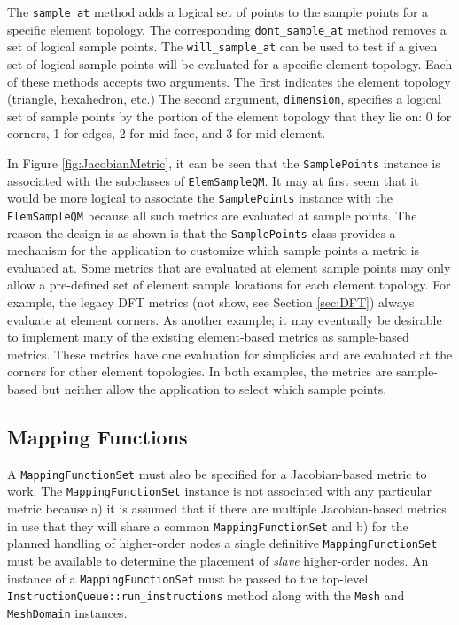\documentclass{article}
\begin{document}
The \texttt{sample\_at} method adds a logical set of points to the sample points for a specific element topology.  The corresponding \texttt{dont\_sample\_at} method removes a set of logical sample points.  The \texttt{will\_sample\_at} can be used to test if a given set of logical sample points will be evaluated for a specific element topology.  Each of these methods accepts two arguments.  The first indicates the element topology (triangle, hexahedron, etc.)  The second argument, \texttt{dimension}, specifies a logical set of sample points by the portion of the element topology that they lie on: 0 for corners, 1 for edges, 2 for mid-face, and 3 for mid-element.

In Figure \ref{fig:JacobianMetric}, it can be seen that the \texttt{SamplePoints} instance is associated with the subclasses of \texttt{ElemSampleQM}.  It may at first seem that it would be more logical to associate the \texttt{SamplePoints} instance with the \texttt{ElemSampleQM} because all such metrics are evaluated at sample points.  The reason the design is as shown is that the \texttt{SamplePoints} class provides a mechanism for the application to customize which sample points a metric is evaluated at.  Some metrics that are evaluated at element sample points may only allow a pre-defined set of element sample locations for each element topology.  For example, the legacy DFT metrics (not show, see Section \ref{sec:DFT}) always evaluate at element corners.  As another example; it may eventually be desirable to implement many of the existing element-based metrics as sample-based metrics.  These metrics have one evaluation for simplicies and are evaluated at the corners for other element topologies.  In both examples, the metrics are sample-based but neither allow the application to select which sample points.

\subsection{Mapping Functions}

A \texttt{MappingFunctionSet} must also be specified for a Jacobian-based metric to work.  The \texttt{MappingFunctionSet} instance is not associated with any particular metric because a) it is assumed that if there are multiple Jacobian-based metrics in use that they will share a common \texttt{MappingFunctionSet} and b) for the planned handling of higher-order nodes a single definitive \texttt{MappingFunctionSet} must be available to determine the placement of \emph{slave} higher-order nodes.  An instance of a \texttt{MappingFunctionSet} must be passed to the top-level \texttt{InstructionQueue::run\_instructions} method along with the \texttt{Mesh} and \texttt{MeshDomain} instances.
\end{document}
